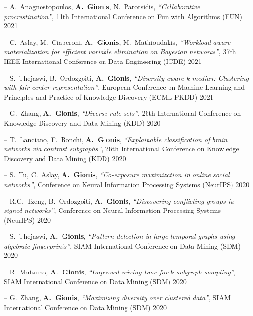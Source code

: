 \documentclass[a4paper,11pt]{article}
\begin{document}
\item[--] 
{A.\ Anagnostopoulos, \textbf{A.\ Gionis}, N.\ Parotsidis},
{\em ``Collaborative procrastination''},
11th International Conference on Fun with Algorithms (FUN) 2021

\item[--] 
{C.\ Aslay, M.\ Ciaperoni, \textbf{A.\ Gionis}, M.\ Mathioudakis},
{\em ``Workload-aware materialization for efficient variable elimination on Bayesian networks''},
37th IEEE International Conference on Data Engineering (ICDE) 2021

\item[--] 
{S.\ Thejaswi, B.\ Ordozgoiti, \textbf{A.\ Gionis}},
{\em ``Diversity-aware $k$-median: Clustering with fair center representation''},
European Conference on Machine Learning and Principles and Practice of Knowledge Discovery (ECML PKDD) 2021 

\item[--] 
{G.\ Zhang, \textbf{A.\ Gionis}},
{\em ``Diverse rule sets''},
26th International Conference on Knowledge Discovery and Data Mining (KDD) 2020

\item[--] 
{T.\ Lanciano, F.\ Bonchi, \textbf{A.\ Gionis}},
{\em ``Explainable classification of brain networks via contrast subgraphs''},
26th International Conference on Knowledge Discovery and Data Mining (KDD) 2020

\item[--] 
{S.\ Tu, C.\ Aslay, \textbf{A.\ Gionis}},
{\em ``Co-exposure maximization in online social networks''},
Conference on Neural Information Processing Systems (NeurIPS) 2020

\item[--] 
{R.C.\ Tzeng, B.\ Ordozgoiti, \textbf{A.\ Gionis}},
{\em ``Discovering conflicting groups in signed networks''},
Conference on Neural Information Processing Systems (NeurIPS) 2020

\item[--] 
{S.\ Thejaswi, \textbf{A.\ Gionis}},
{\em ``Pattern detection in large temporal graphs using algebraic fingerprints''},
SIAM International Conference on Data Mining (SDM) 2020

\item[--] 
{R.\ Matsuno, \textbf{A.\ Gionis}},
{\em ``Improved mixing time for $k$-subgraph sampling''},
SIAM International Conference on Data Mining (SDM) 2020

\item[--] 
{G.\ Zhang, \textbf{A.\ Gionis}},
{\em ``Maximizing diversity over clustered data''},
SIAM International Conference on Data Mining (SDM) 2020
\end{document}
